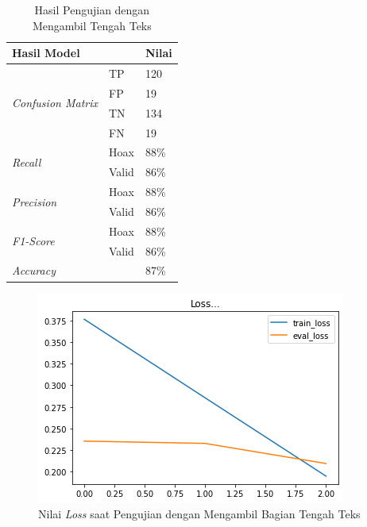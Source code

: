 \begin{table}[h]
    \caption{Hasil Pengujian dengan Mengambil Tengah Teks}
    \label{tab: const_tengah}
    \centering
    \begin{tabular}{|l|l|l|}
        \hline
        \multicolumn{2}{|l|}{\textbf{Hasil Model}} & \textbf{Nilai}        \\ \hline
        \multirow{4}{*}{\textit{Confusion Matrix}} & TP             & 120  \\ \cline{2-3}
                                                   & FP             & 19   \\ \cline{2-3}
                                                   & TN             & 134  \\ \cline{2-3}
                                                   & FN             & 19   \\ \hline
        \multirow{2}{*}{\textit{Recall}}           & Hoax           & 88\% \\ \cline{2-3}
                                                   & Valid          & 86\% \\ \hline
        \multirow{2}{*}{\textit{Precision}}        & Hoax           & 88\% \\ \cline{2-3}
                                                   & Valid          & 86\% \\ \hline
        \multirow{2}{*}{\textit{F1-Score}}         & Hoax           & 88\% \\ \cline{2-3}
                                                   & Valid          & 86\% \\ \hline
        \multicolumn{2}{|l|}{\textit{Accuracy}}    & 87\%                  \\ \hline
    \end{tabular}
\end{table}

\begin{figure}[h]
    \begin{center}
        \includegraphics[width= 0.9\linewidth]{gambar/loss_concat_tengah.png}
        \caption{Nilai \textit{Loss} saat Pengujian dengan Mengambil Bagian Tengah Teks}
        \label{fig: loss_const_tengah}
    \end{center}
\end{figure}


